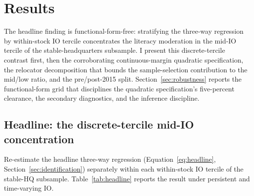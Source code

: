 \section{Results}
\label{sec:results}

The headline finding is functional-form-free: stratifying the three-way regression by within-stock IO tercile concentrates the literacy moderation in the mid-IO tercile of the stable-headquarters subsample. I present this discrete-tercile contrast first, then the corroborating continuous-margin quadratic specification, the relocator decomposition that bounds the sample-selection contribution to the mid/low ratio, and the pre/post-2015 split. Section~\ref{sec:robustness} reports the functional-form grid that disciplines the quadratic specification's five-percent clearance, the secondary diagnostics, and the inference discipline.

\subsection{Headline: the discrete-tercile mid-IO concentration}
\label{sec:headline}

Re-estimate the headline three-way regression (Equation~\eqref{eq:headline}, Section~\ref{sec:identification}) separately within each within-stock IO tercile of the stable-HQ subsample. Table~\ref{tab:headline} reports the result under persistent and time-varying IO.

